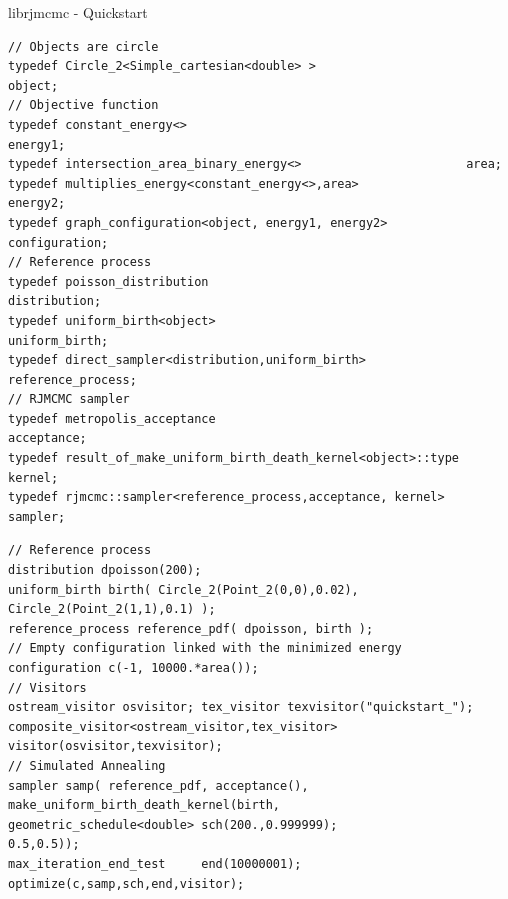 \documentclass{beamer}
\begin{document}
\begin{frame}[containsverbatim]{librjmcmc - Quickstart}
\tiny
\begin{lstlisting}
// Objects are circle
typedef Circle_2<Simple_cartesian<double> >                     object;
// Objective function
typedef constant_energy<>                                       energy1;
typedef intersection_area_binary_energy<>                       area;
typedef multiplies_energy<constant_energy<>,area>               energy2;
typedef graph_configuration<object, energy1, energy2>           configuration;
// Reference process
typedef poisson_distribution                                    distribution;
typedef uniform_birth<object>                                   uniform_birth;
typedef direct_sampler<distribution,uniform_birth>              reference_process;
// RJMCMC sampler
typedef metropolis_acceptance                                   acceptance;
typedef result_of_make_uniform_birth_death_kernel<object>::type kernel;
typedef rjmcmc::sampler<reference_process,acceptance, kernel>   sampler;
\end{lstlisting}
\begin{lstlisting}
// Reference process
distribution dpoisson(200);
uniform_birth birth( Circle_2(Point_2(0,0),0.02), Circle_2(Point_2(1,1),0.1) );
reference_process reference_pdf( dpoisson, birth );
// Empty configuration linked with the minimized energy
configuration c(-1, 10000.*area());
// Visitors
ostream_visitor osvisitor; tex_visitor texvisitor("quickstart_");
composite_visitor<ostream_visitor,tex_visitor>  visitor(osvisitor,texvisitor);
// Simulated Annealing
sampler samp( reference_pdf, acceptance(), make_uniform_birth_death_kernel(birth,
geometric_schedule<double> sch(200.,0.999999);                         0.5,0.5));
max_iteration_end_test     end(10000001);
optimize(c,samp,sch,end,visitor);
\end{lstlisting}

\end{frame}
\end{document}
